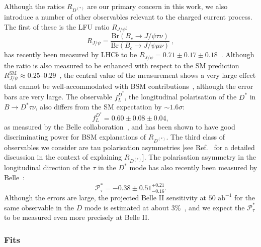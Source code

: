 Although the ratios $R_{D^{(*)}}$ are our primary concern in this work, we also
introduce a number of other observables relevant to the charged current process.
The first of these is the LFU ratio $R_{J/\psi}$:
\begin{equation}
  \label{eq:rjpsi}
  R_{J/\psi} = \frac{\mathrm{Br}(B_{c} \to J/\psi \tau \nu)}{\mathrm{Br}(B_{c} \to J/\psi \mu \nu)} \ ,
\end{equation}
has recently been measured by LHC$b$ to be
$R_{J/\psi} = 0.71 \pm 0.17 \pm 0.18$~\cite{Aaij:2017tyk}. Although the ratio is
also measured to be enhanced with respect to the SM prediction
$R_{J/\psi}^{\text{SM}} \approx 0.25$--$0.29$~\cite{Anisimov:1998uk,
  Kiselev:2002vz, Ivanov:2006ni, Hernandez:2006gt, Huang:2007kb, Wang:2008xt,
  Issadykov:2018myx, Wen-Fei:2013uea, Alok:2017qsi, Azatov:2018knx, Hu:2019qcn,
  Leljak:2019eyw, Azizi:2019aaf}, the central value of the measurement shows a
very large effect that cannot be well-accommodated with BSM
contributions~\cite{Murgui:2019czp}, although the error bars are very large. The
observable $f_L^{D^*}$, the longitudinal polarisation of the $D^*$ in
$B \to D^* \tau \nu$, also differs from the SM expectation by $\sim 1.6 \sigma$:
\begin{equation}
    f_L^{D^*} = 0.60 \pm 0.08 \pm 0.04,
\end{equation}
as measured by the Belle collaboration~\cite{Abdesselam:2019wbt}, and has been
shown to have good discriminating power for BSM explanations of $R_{D^{(*)}}$.
The third class of observables we consider are tau polarisation asymmetries [see
Ref.~\cite{Asadi:2018sym} for a detailed discussion in the context of explaining
$R_{D^{(*)}}$]. The polarisation asymmetry in the longitudinal direction of the
$\tau$ in the $D^*$ mode has also recently been measured by
Belle~\cite{Hirose:2016wfn}:
\begin{equation}
\mathcal{P}_{\tau}^{*} = -0.38 \pm 0.51^{+0.21}_{-0.16} .
\end{equation}
Although the errors are large, the projected Belle II sensitivity at
$50 \text{ ab}^{-1}$ for the same observable in the $D$ mode is estimated at
about $3\%$~\cite{Alonso:2017ktd}, and we expect the $\mathcal{P}_\tau^{*}$ to
be measured even more precisely at Belle II.

\subsubsection{Fits}

